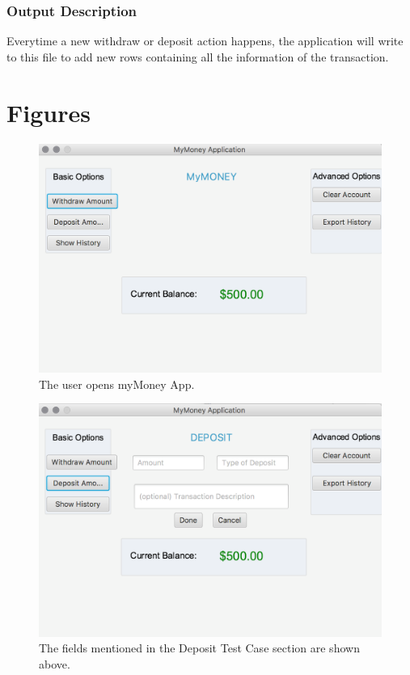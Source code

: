 \documentclass[12pt]{article}
\begin{document}
\subsubsection{Output Description}
Everytime a new withdraw or deposit action happens, the application will write to this file to add new rows containing all the information of the transaction.

\clearpage 
\section{Figures}

\begin{figure}[H]
  \includegraphics[width=\linewidth]{open_app.png}
  \caption{The user opens myMoney App.}
\end{figure}

\begin{figure}[H]
  \includegraphics[width=\linewidth]{deposit_click.png}
  \caption{The fields mentioned in the Deposit Test Case section are shown above.}
\end{figure}
\end{document}
